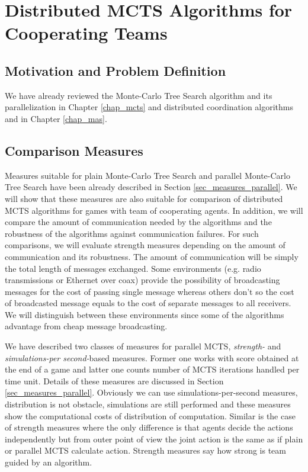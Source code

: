 \chapter{Distributed MCTS Algorithms for Cooperating Teams}
\label{chap_dmcts_design}

\section{Motivation and Problem Definition}


We have already reviewed the Monte-Carlo Tree Search algorithm and its parallelization in
 Chapter \ref{chap_mcts} and distributed coordination algorithms and in Chapter \ref{chap_mas}.




\section{Comparison Measures}
\label{sec_measures_distributed}

Measures suitable for plain Monte-Carlo Tree Search and parallel
Monte-Carlo Tree Search have been already described in Section \ref{sec_measures_parallel}.
We will show that these
measures are also suitable for comparison of distributed MCTS algorithms for games with team
of cooperating agents. In addition, we will compare the amount of communication needed by the
algorithms and the robustness of the algorithms against communication failures. For such
comparisons, we will evaluate strength measures depending on the amount of communication and
its robustness. The amount of communication will be simply the total length of messages
exchanged. Some environments (e.g. radio transmissions or Ethernet over coax) provide the 
possibility of broadcasting messages for the cost of passing single message whereas others 
don't so the cost of broadcasted message equals to the cost of separate messages to all
receivers. We will distinguish between these
environments since some of the algorithms advantage from cheap message broadcasting.

We have described two classes of measures for parallel MCTS, \emph{strength-} and
\emph{simulations-per second-}based measures. Former one works with score obtained at the end
of a game and latter one counts number of MCTS iterations handled per time unit. Details of
these measures are discussed in Section \ref{sec_measures_parallel}. Obviously we can use
simulations-per-second measures, distribution is not obstacle, simulations are still performed
and these measures show the computational costs of distribution of computation. Similar is the
case of strength measures where the only difference is that agents decide the actions
independently but from outer point of view the joint action is the same as if plain or parallel
MCTS calculate action. Strength measures say how strong is team guided by an algorithm.

